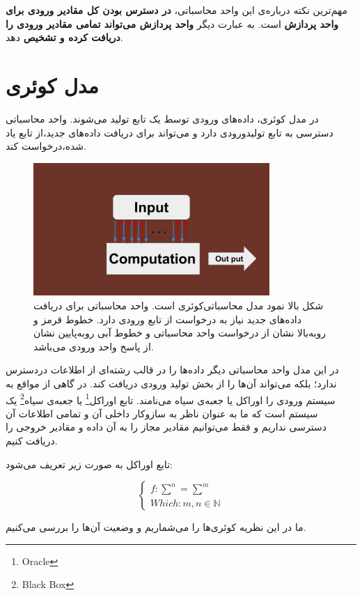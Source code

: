 \documentclass{book}
\begin{document}
مهم‌ترین نکته درباره‌ی این واحد محاسباتی،‌ \textbf{در دسترس بودن کل مقادیر ورودی برای واحد پردازش} است. به عبارت دیگر\textbf{ واحد پردازش می‌تواند تمامی مقادیر ورودی را دریافت کرده و تشخیص} دهد. 

\section{مدل کوئری}
در مدل کوئری، داده‌های ورودی توسط یک تابع تولید می‌شوند. واحد محاسباتی دسترسی به تابع تولیدورودی دارد و می‌تواند برای دریافت داده‌های جدید،‌از تابع یاد شده،‌درخواست کند.

\begin{figure}[ht]
	\centering
	\includegraphics[width=0.8\textwidth]{Query computation model.png}
	\caption{شکل بالا نمود مدل محاسباتی‌کوئری است. واحد محاسباتی برای دریافت داده‌های جدید نیاز به درخواست از تابع ورودی دارد. خطوط قرمز و روبه‌بالا نشان از درخواست واحد محاسباتی و خطوط آبی روبه‌پایین نشان از پاسخ واحد ورودی می‌باشد.}
\end{figure}


در این مدل واحد محاسباتی دیگر داده‌ها را در قالب رشته‌ای از اطلاعات دردسترس ندارد؛ بلکه می‌تواند آن‌ها را از بخش تولید ورودی دریافت کند. در گاهی از مواقع به سیستم ورودی را اوراکل یا جعبه‌ی سیاه می‌نامند. تابع اوراکل\footnote{Oracle} یا جعبه‌ی سیاه\footnote{Black Box} یک سیستم است که ما به عنوان ناظر به سازوکار داخلی آن و  تمامی اطلاعات آن دسترسی نداریم و فقط می‌توانیم مقادیر مجاز را به آن داده و مقادیر خروجی را دریافت کنیم. 

تابع اوراکل به صورت زیر تعریف می‌شود:
\begin{center}
$$
\left\{
\begin{array}{ll}
f : \sum^n = \sum^m\\
Which : m, n \in \mathbb{N}
\end{array}
\right.
$$
\end{center}

ما در این نظریه کوئری‌ها را می‌شماریم و وضعیت آن‌‌ها را بررسی می‌کنیم.
\end{document}
